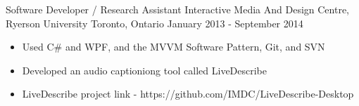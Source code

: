 \begin{cventries}
    \cventry
    {Software Developer / Research Assistant}
    {Interactive Media And Design Centre, Ryerson University}
    {Toronto, Ontario}
    {January 2013 - September 2014}
    {
        \renewcommand{\labelitemii}{\bullet}
        \begin{cvitems}
            \item[] {
                \begin{itemize}
                    \item {Used C\# and WPF, and the MVVM Software Pattern, Git, and SVN}
                    \item {Developed an audio captioniong tool called LiveDescribe}
                    \item {LiveDescribe project link - https://github.com/IMDC/LiveDescribe-Desktop}
                \end{itemize}
            }
        \end{cvitems}
    }
\end{cventries}
